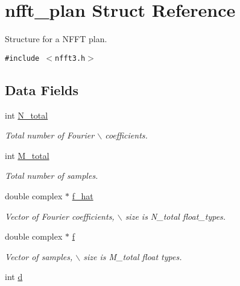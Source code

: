 \hypertarget{structnfft__plan}{
\section{nfft\_\-plan Struct Reference}
\label{structnfft__plan}
}
Structure for a NFFT plan.  


{\tt \#include $<$nfft3.h$>$}

\subsection*{Data Fields}
\begin{CompactItemize}
\item 
\hypertarget{structnfft__plan_o0}{
int \hyperlink{structnfft__plan_o0}{N\_\-total}}
\label{structnfft__plan_o0}

\begin{CompactList}\small\item\em Total number of Fourier $\backslash$ coefficients. \item\end{CompactList}\item 
\hypertarget{structnfft__plan_o1}{
int \hyperlink{structnfft__plan_o1}{M\_\-total}}
\label{structnfft__plan_o1}

\begin{CompactList}\small\item\em Total number of samples. \item\end{CompactList}\item 
\hypertarget{structnfft__plan_o2}{
double complex $\ast$ \hyperlink{structnfft__plan_o2}{f\_\-hat}}
\label{structnfft__plan_o2}

\begin{CompactList}\small\item\em Vector of Fourier coefficients, $\backslash$ size is N\_\-total float\_\-types. \item\end{CompactList}\item 
\hypertarget{structnfft__plan_o3}{
double complex $\ast$ \hyperlink{structnfft__plan_o3}{f}}
\label{structnfft__plan_o3}

\begin{CompactList}\small\item\em Vector of samples, $\backslash$ size is M\_\-total float types. \item\end{CompactList}\item 
\hypertarget{structnfft__plan_o4}{
int \hyperlink{structnfft__plan_o4}{d}}
\label{structnfft__plan_o4}


\end{CompactItemize}
